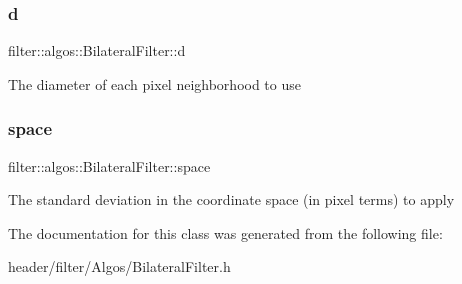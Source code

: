 \subsubsection{\texorpdfstring{d}{d}}
{\footnotesize\ttfamily filter\+::algos\+::\+Bilateral\+Filter\+::d}

The diameter of each pixel neighborhood to use \mbox{\label{classfilter_1_1algos_1_1_bilateral_filter_a9b408992e14ae094c68c4cd3f706def0}} 
\subsubsection{\texorpdfstring{space}{space}}
{\footnotesize\ttfamily filter\+::algos\+::\+Bilateral\+Filter\+::space}

The standard deviation in the coordinate space (in pixel terms) to apply 

The documentation for this class was generated from the following file\+:\begin{DoxyCompactItemize}
\item 
header/filter/\+Algos/Bilateral\+Filter.\+h\end{DoxyCompactItemize}
